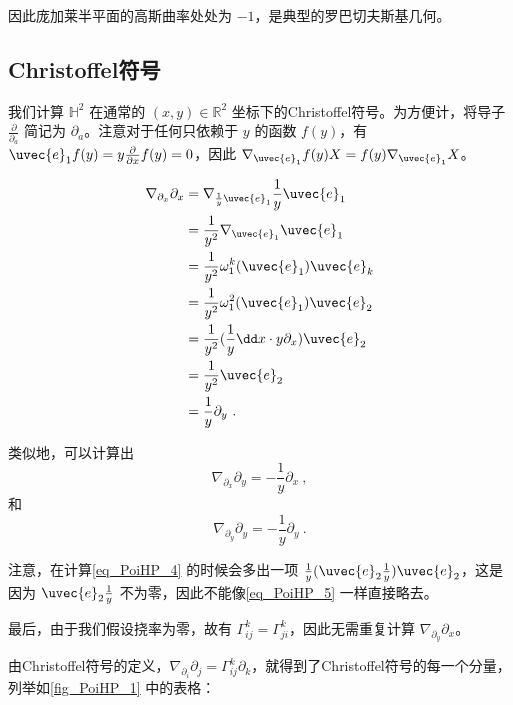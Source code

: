 因此庞加莱半平面的高斯曲率处处为 $-1$，是典型的罗巴切夫斯基几何。




\subsection{Christoffel符号}

我们计算 $\mathbb{H}^2$ 在通常的 $(x, y)\in\mathbb{R}^2$ 坐标下的Christoffel符号。为方便计，将导子 $\frac{\partial}{\partial_a}$ 简记为 $\partial_a$。注意对于任何只依赖于 $y$ 的函数 $f(y)$，有 $\uvec{e}_1f(y)=y\frac{\partial}{\partial x}f(y)=0$，因此 $\nabla_{\uvec{e}_1}f(y)X=f(y)\nabla_{\uvec{e}_1}X$。

\begin{equation}\label{eq_PoiHP_5}
\begin{aligned}
\nabla_{\partial_x}\partial_x&=\nabla_{\frac{1}{y}\uvec{e}_1}\frac{1}{y}\uvec{e}_1\\
&=\frac{1}{y^2}\nabla_{\uvec{e}_1}\uvec{e}_1\\
&=\frac{1}{y^2}\omega^k_1(\uvec{e}_1)\uvec{e}_k\\
&=\frac{1}{y^2}\omega^2_1(\uvec{e}_1)\uvec{e}_2\\
&=\frac{1}{y^2}(\frac{1}{y}\dd x\cdot y\partial_x)\uvec{e}_2\\
&=\frac{1}{y^2}\uvec{e}_2\\
&=\frac{1}{y}\partial_y~.
\end{aligned}
\end{equation}

类似地，可以计算出
\begin{equation}
\nabla_{\partial_x}\partial_y=-\frac{1}{y}\partial_x~,
\end{equation}
和
\begin{equation}\label{eq_PoiHP_4}
\nabla_{\partial_y}\partial_y=-\frac{1}{y}\partial_y~.
\end{equation}

注意，在计算\autoref{eq_PoiHP_4} 的时候会多出一项 $\frac{1}{y}(\uvec{e}_2\frac{1}{y})\uvec{e}_2$，这是因为 $\uvec{e}_2\frac{1}{y}$ 不为零，因此不能像\autoref{eq_PoiHP_5} 一样直接略去。

最后，由于我们假设挠率为零，故有 $\Gamma^k_{ij}=\Gamma^k_{ji}$，因此无需重复计算 $\nabla_{\partial_y}\partial_x$。

由Christoffel符号的定义，$\nabla_{\partial_i}\partial_j=\Gamma^k_{ij}\partial_k$，就得到了Christoffel符号的每一个分量，列举如\autoref{fig_PoiHP_1} 中的表格：

